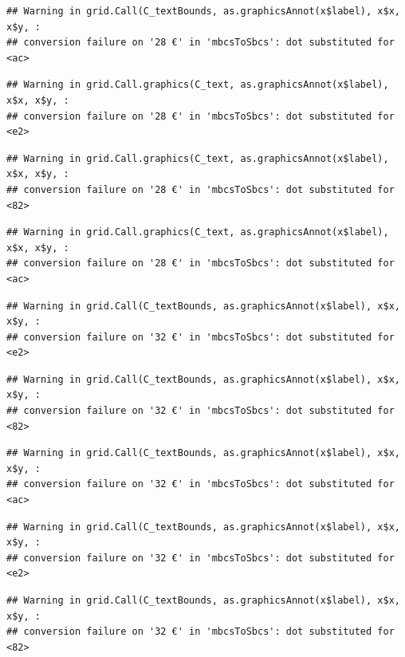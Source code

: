 \documentclass[
]{article}
\begin{document}
\begin{verbatim}
## Warning in grid.Call(C_textBounds, as.graphicsAnnot(x$label), x$x, x$y, :
## conversion failure on '28 €' in 'mbcsToSbcs': dot substituted for <ac>
\end{verbatim}

\begin{verbatim}
## Warning in grid.Call.graphics(C_text, as.graphicsAnnot(x$label), x$x, x$y, :
## conversion failure on '28 €' in 'mbcsToSbcs': dot substituted for <e2>
\end{verbatim}

\begin{verbatim}
## Warning in grid.Call.graphics(C_text, as.graphicsAnnot(x$label), x$x, x$y, :
## conversion failure on '28 €' in 'mbcsToSbcs': dot substituted for <82>
\end{verbatim}

\begin{verbatim}
## Warning in grid.Call.graphics(C_text, as.graphicsAnnot(x$label), x$x, x$y, :
## conversion failure on '28 €' in 'mbcsToSbcs': dot substituted for <ac>
\end{verbatim}

\begin{verbatim}
## Warning in grid.Call(C_textBounds, as.graphicsAnnot(x$label), x$x, x$y, :
## conversion failure on '32 €' in 'mbcsToSbcs': dot substituted for <e2>
\end{verbatim}

\begin{verbatim}
## Warning in grid.Call(C_textBounds, as.graphicsAnnot(x$label), x$x, x$y, :
## conversion failure on '32 €' in 'mbcsToSbcs': dot substituted for <82>
\end{verbatim}

\begin{verbatim}
## Warning in grid.Call(C_textBounds, as.graphicsAnnot(x$label), x$x, x$y, :
## conversion failure on '32 €' in 'mbcsToSbcs': dot substituted for <ac>
\end{verbatim}

\begin{verbatim}
## Warning in grid.Call(C_textBounds, as.graphicsAnnot(x$label), x$x, x$y, :
## conversion failure on '32 €' in 'mbcsToSbcs': dot substituted for <e2>
\end{verbatim}

\begin{verbatim}
## Warning in grid.Call(C_textBounds, as.graphicsAnnot(x$label), x$x, x$y, :
## conversion failure on '32 €' in 'mbcsToSbcs': dot substituted for <82>
\end{verbatim}
\end{document}
